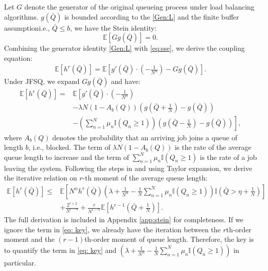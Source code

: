 \documentclass[11pt,oneside,letter]{article}
\begin{document}
Let $G$ denote the generator of the original queueing process under load balancing algorithms. $g(\bar Q)$ is bounded according to the \eqref{Gen:L} and the finite buffer assumptioni.e., $\bar Q \leq b$, 
we have the Stein identity:
\begin{equation}
\mathbb{E}[G g(\bar{Q})] = 0. \label{eq:sse}
\end{equation}
Combining the generator identity \eqref{Gen:L} with \eqref{eq:sse}, we derive the coupling equation:
\begin{align}
\mathbb{E}\left[h^r(\bar{Q})\right] 
= \mathbb{E}\left[ g'(\bar{Q}) \cdot \left(-\frac{1}{N^\alpha}\right) - G g(\bar{Q}) \right]. \label{eq:gencou-mainpage}
\end{align}
Under JFSQ, we expand $G g(\bar{Q})$ and have:
\begin{align}
\mathbb{E}\left[h^r(\bar{Q})\right]
=&\mathbb{E}\left[ g'(\bar{Q}) \cdot \left(-\frac{1}{N^\alpha} \right) \right. \nonumber\\
&\left. - \lambda N(1 - A_b(Q)) \left(g\left(\bar{Q} + \frac{1}{N} \right) - g(\bar{Q})\right) \right. \nonumber\\
&\left. - \left(\sum_{n=1}^{N} \mu_n \mathbb{I}(Q_n \geq 1)\right) \left(g\left(\bar{Q} - \frac{1}{N}\right) - g(\bar{Q})\right) \right], \label{gen-diff}
\end{align}
where $A_b(Q)$ denotes the probability that an arriving job joins a queue of length $b$, i.e., blocked. The term of $\lambda N(1-A_b(Q))$ is the rate of the average queue length to increase and the term of $\sum_{n=1}^{N} \mu_n \mathbb{I}(Q_n \geq 1)$ is the rate of a job leaving the system. 
Following the steps in \cite{LiuYin_20} and using Taylor expansion, we derive the iterative relation on $r$-th moment of the average queue length:
\begin{align}
\mathbb{E}\left[h^r\left( \bar Q \right) \right] 
\leq & \mathbb{E} \left[ N^{\alpha} h^r\left(\bar Q \right) \left(\lambda + \frac{1}{N^\alpha} - \frac{1}{N} \sum_{n=1}^{N} \mu_n \mathbb{I}(Q_n \geq 1) \right) \mathbb{I}({\bar{Q} > \eta + \frac{1}{N}}) \right] \label{eq: key}\\
& + \frac{2^{r+2}}{N^{r - \alpha}} 
+ \frac{r}{N^{1 - \alpha}} \mathbb{E} \left[ h^{r-1} \left( \bar{Q} + \frac{1}{N} \right) \right]. \label{eq: key 1}
\end{align}
The full derivation is included in Appendix \ref{app:stein} for completeness. 
If we ignore the term in \eqref{eq: key}, we already have the iteration between the $r$th-order moment and the $(r-1)$th-order moment of queue length. Therefore, the key is to quantify the term in \eqref{eq: key} and $(\lambda + \frac{1}{N^\alpha} - \frac{1}{N} \sum_{n=1}^{N} \mu_n \mathbb{I}(Q_n \geq 1))$ in particular. 
\end{document}
